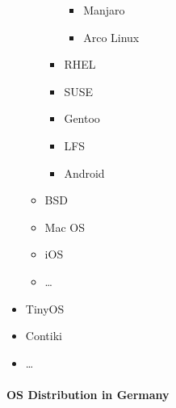 \begin{itemize}
\begin{itemize}
\begin{itemize}
      \begin{itemize}
      \tightlist
      \item
        Manjaro
      \item
        Arco Linux
      \end{itemize}
    \item
      RHEL
    \item
      SUSE
    \item
      Gentoo
    \item
      LFS
    \item
      Android
    \end{itemize}
  \item
    BSD
  \item
    Mac OS
  \item
    iOS
  \item
    \ldots{}
  \end{itemize}
\item
  TinyOS
\item
  Contiki
\item
  \ldots{}
\end{itemize}

\hypertarget{os-distribution-in-germany}{%
\paragraph{OS Distribution in
Germany}\label{os-distribution-in-germany}}

